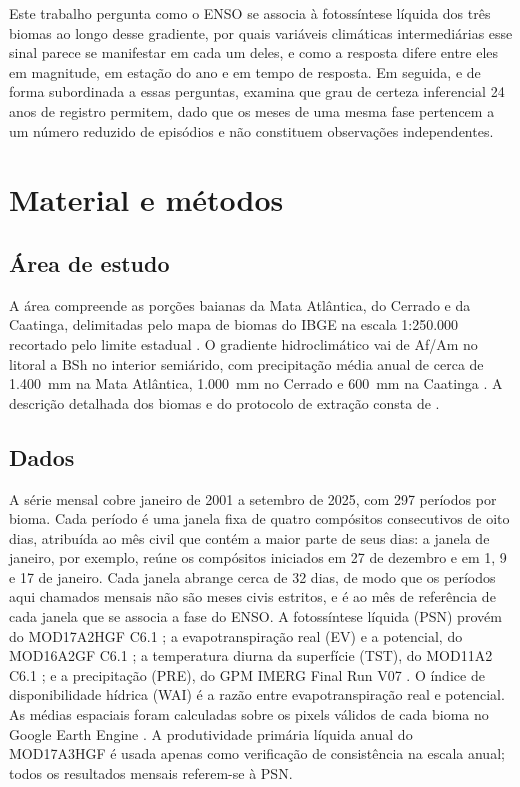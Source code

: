 \documentclass[a4paper,fleqn]{cas-sc}
\begin{document}
Este trabalho pergunta como o ENSO se associa à fotossíntese líquida dos três biomas ao longo desse gradiente, por quais variáveis climáticas intermediárias esse sinal parece se manifestar em cada um deles, e como a resposta difere entre eles em magnitude, em estação do ano e em tempo de resposta. Em seguida, e de forma subordinada a essas perguntas, examina que grau de certeza inferencial 24 anos de registro permitem, dado que os meses de uma mesma fase pertencem a um número reduzido de episódios e não constituem observações independentes.

\section{Material e métodos}

\subsection{Área de estudo}

A área compreende as porções baianas da Mata Atlântica, do Cerrado e da Caatinga, delimitadas pelo mapa de biomas do IBGE na escala 1:250.000 recortado pelo limite estadual \citep{ibge2019}. O gradiente hidroclimático vai de Af/Am no litoral a BSh no interior semiárido, com precipitação média anual de cerca de 1.400~mm na Mata Atlântica, 1.000~mm no Cerrado e 600~mm na Caatinga \citep{alvares2013}. A descrição detalhada dos biomas e do protocolo de extração consta de \citet{oliveira2026}.

\subsection{Dados}

A série mensal cobre janeiro de 2001 a setembro de 2025, com 297 períodos por bioma. Cada período é uma janela fixa de quatro compósitos consecutivos de oito dias, atribuída ao mês civil que contém a maior parte de seus dias: a janela de janeiro, por exemplo, reúne os compósitos iniciados em 27 de dezembro e em 1, 9 e 17 de janeiro. Cada janela abrange cerca de 32 dias, de modo que os períodos aqui chamados mensais não são meses civis estritos, e é ao mês de referência de cada janela que se associa a fase do ENSO. A fotossíntese líquida (PSN) provém do MOD17A2HGF C6.1 \citep{running2021gpp}; a evapotranspiração real (EV) e a potencial, do MOD16A2GF C6.1 \citep{running2021et}; a temperatura diurna da superfície (TST), do MOD11A2 C6.1 \citep{wan2021}; e a precipitação (PRE), do GPM IMERG Final Run V07 \citep{huffman2023}. O índice de disponibilidade hídrica (WAI) é a razão entre evapotranspiração real e potencial. As médias espaciais foram calculadas sobre os pixels válidos de cada bioma no Google Earth Engine \citep{gorelick2017}. A produtividade primária líquida anual do MOD17A3HGF é usada apenas como verificação de consistência na escala anual; todos os resultados mensais referem-se à PSN.
\end{document}
